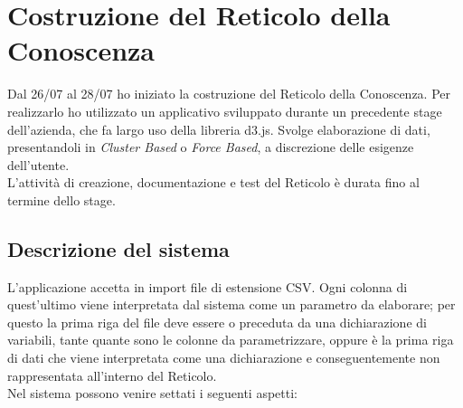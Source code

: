 \section{Costruzione del Reticolo della Conoscenza}
\label{Costruzione del Reticolo della Conoscenza}
Dal 26/07 al 28/07 ho iniziato la costruzione del Reticolo della Conoscenza. Per realizzarlo ho utilizzato un applicativo sviluppato durante un precedente stage dell'azienda, che fa largo uso della libreria d3.js. Svolge elaborazione di dati, presentandoli in \textit{Cluster Based} o \textit{Force Based}, a discrezione delle esigenze dell'utente.\\
L'attivit\`a di creazione, documentazione e test del Reticolo \`e durata fino al termine dello stage.

\subsection{Descrizione del sistema}
\label{Descrizione del sistema}
L'applicazione accetta in import file di estensione CSV. Ogni colonna di quest'ultimo viene interpretata dal sistema come un parametro da elaborare; per questo la prima riga del file deve essere o preceduta da una dichiarazione di variabili, tante quante sono le colonne da parametrizzare, oppure \`e la prima riga di dati che viene interpretata come una dichiarazione e conseguentemente non rappresentata all'interno del Reticolo.\\
Nel sistema possono venire settati i seguenti aspetti:
